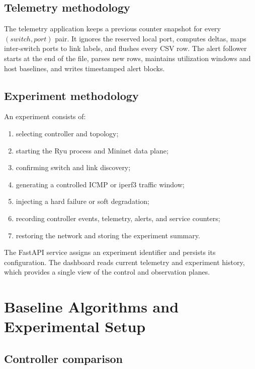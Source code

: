 \documentclass[conference]{IEEEtran}
\begin{document}
\subsection{Telemetry methodology}

The telemetry application keeps a previous counter snapshot for every
$(switch,port)$ pair. It ignores the reserved local port, computes deltas,
maps inter-switch ports to link labels, and flushes every CSV row. The alert
follower starts at the end of the file, parses new rows, maintains utilization
windows and host baselines, and writes timestamped alert blocks.

\subsection{Experiment methodology}

An experiment consists of:
\begin{enumerate}
\item selecting controller and topology;
\item starting the Ryu process and Mininet data plane;
\item confirming switch and link discovery;
\item generating a controlled ICMP or iperf3 traffic window;
\item injecting a hard failure or soft degradation;
\item recording controller events, telemetry, alerts, and service counters;
\item restoring the network and storing the experiment summary.
\end{enumerate}
The FastAPI service assigns an experiment identifier and persists its
configuration. The dashboard reads current telemetry and experiment history,
which provides a single view of the control and observation planes.

\section{Baseline Algorithms and Experimental Setup}
\label{sec:setup}

\subsection{Controller comparison}
\end{document}

